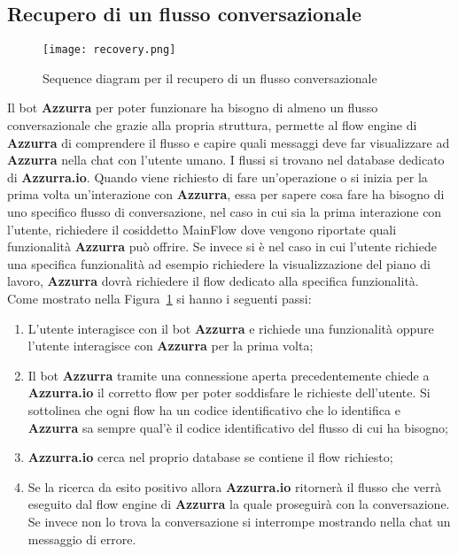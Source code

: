 \subsection{Recupero di un flusso conversazionale}
\begin{figure}[h]
	\begin{center}
		\texttt{[image: recovery.png]}
		\caption{Sequence diagram per il recupero di un flusso conversazionale}\label{fig:recovery}
	\end{center}
\end{figure}
Il bot \textbf{Azzurra} per poter funzionare ha bisogno di almeno un flusso conversazionale che grazie alla propria struttura, permette al flow engine di \textbf{Azzurra} di comprendere il flusso e capire quali messaggi deve far visualizzare ad \textbf{Azzurra} nella chat con l'utente umano. I flussi si trovano nel database dedicato di \textbf{Azzurra.io}. Quando viene richiesto di fare un’operazione o si inizia per la prima volta un'interazione con \textbf{Azzurra}, essa per sapere cosa fare ha bisogno di uno specifico flusso di conversazione, nel caso in cui sia la prima interazione con l'utente, richiedere il cosiddetto MainFlow dove vengono riportate quali funzionalità \textbf{Azzurra} può offrire. Se invece si è nel caso in cui l'utente richiede una specifica funzionalità ad esempio richiedere la visualizzazione del piano di lavoro, \textbf{Azzurra} dovrà richiedere il flow dedicato alla specifica funzionalità.
Come mostrato nella Figura~\ref{fig:recovery} si hanno i seguenti passi:
\begin{enumerate}
\item L'utente interagisce con il bot \textbf{Azzurra} e richiede una funzionalità oppure l'utente interagisce con \textbf{Azzurra} per la prima volta;
\item Il bot \textbf{Azzurra} tramite una connessione aperta precedentemente chiede a \textbf{Azzurra.io} il corretto flow per poter soddisfare le richieste dell'utente. Si sottolinea che ogni flow ha un codice identificativo che lo identifica e \textbf{Azzurra} sa sempre qual'è il codice identificativo del flusso di cui ha bisogno;
\item \textbf{Azzurra.io} cerca nel proprio database se contiene il flow richiesto;
\item Se la ricerca da esito positivo allora \textbf{Azzurra.io} ritornerà il flusso che verrà eseguito dal flow engine di \textbf{Azzurra} la quale proseguirà con la conversazione. Se invece non lo trova la conversazione si interrompe mostrando nella chat un messaggio di errore.
\end{enumerate}

